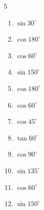 \begin{multicols}{5}
\begin{enumerate}

  \item $\displaystyle \sin{30^\circ}$


  \item $\displaystyle \cos{180^\circ}$

        \phantom{$\displaystyle =-1$}

  \item $\displaystyle \cos{60^\circ}$


  \item $\displaystyle \sin{150^\circ}$


  \item $\displaystyle \cos{180^\circ}$

        \phantom{$\displaystyle =-1$}

  \item $\displaystyle \cos{60^\circ}$


  \item $\displaystyle \cos{45^\circ}$


  \item $\displaystyle \tan{60^\circ}$


  \item $\displaystyle \cos{90^\circ}$

        \phantom{$\displaystyle =0$}

  \item $\displaystyle \sin{135^\circ}$


  \item $\displaystyle \cos{60^\circ}$


  \item $\displaystyle \sin{150^\circ}$


\columnbreak %


\end{enumerate}
\end{multicols}

